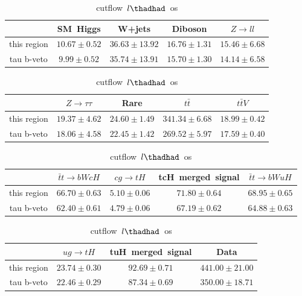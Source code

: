 \begin{table}
\footnotesize
\caption{cutflow~$l\thadhad$~os}
\centering
\begin{tabular}{|c|c|c|c|c|} \hline
 & SM~Higgs & W+jets & Diboson & $Z\to ll$\\\hline
this region & $10.67\pm0.52$ & $36.63\pm13.92$ & $16.76\pm1.31$ & $15.46\pm6.68$\\\hline
tau b-veto & $9.99\pm0.52$ & $35.74\pm13.91$ & $15.70\pm1.30$ & $14.14\pm6.58$\\\hline
\end{tabular}
\begin{tabular}{|c|c|c|c|c|} \hline
 & $Z\to \tau\tau$ & Rare & $t\bar{t}$ & $t\bar{t}V$\\\hline
this region & $19.37\pm4.62$ & $24.60\pm1.49$ & $341.34\pm6.68$ & $18.99\pm0.42$\\\hline
tau b-veto & $18.06\pm4.58$ & $22.45\pm1.42$ & $269.52\pm5.97$ & $17.59\pm0.40$\\\hline
\end{tabular}
\begin{tabular}{|c|c|c|c|c|} \hline
 & $\bar{t}t\to bWcH$ & $cg\to tH$ & tcH~merged~signal & $\bar{t}t\to bWuH$\\\hline
this region & $66.70\pm0.63$ & $5.10\pm0.06$ & $71.80\pm0.64$ & $68.95\pm0.65$\\\hline
tau b-veto & $62.40\pm0.61$ & $4.79\pm0.06$ & $67.19\pm0.62$ & $64.88\pm0.63$\\\hline
\end{tabular}
\begin{tabular}{|c|c|c|c|} \hline
 & $ug\to tH$ & tuH~merged~signal & Data\\\hline
this region & $23.74\pm0.30$ & $92.69\pm0.71$ & $441.00\pm21.00$\\\hline
tau b-veto & $22.46\pm0.29$ & $87.34\pm0.69$ & $350.00\pm18.71$\\\hline
\end{tabular}
\label{tab:cutflow_reg1l2tau1bnj_os}
\end{table}
